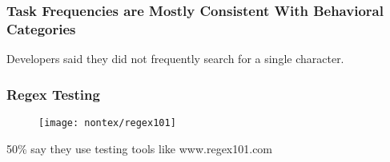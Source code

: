 
\begin{frame}
\frametitle{Task Frequencies are Mostly Consistent With Behavioral Categories}

\begin{center}
Developers said they did not frequently search for a single character.
\end{center}
\end{frame}
\note[itemize]{
    \item
}


\begin{frame}
\frametitle{Regex Testing}

\begin{figure}[ht]
  \texttt{[image: nontex/regex101]}
  \label{fig:regex101}
\end{figure}
\begin{center}
50\% say they use testing tools like www.regex101.com
\end{center}
\end{frame}




